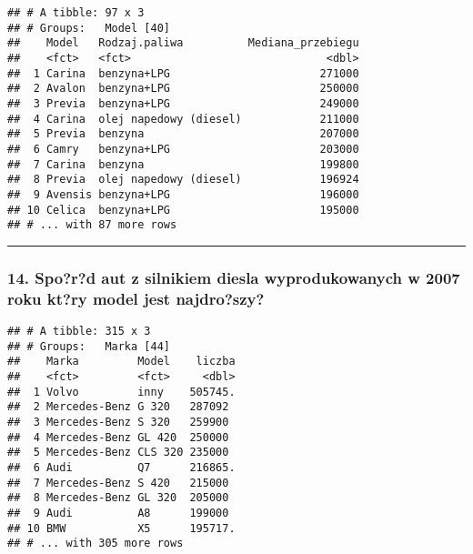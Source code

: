 \documentclass[]{article}
\newenvironment{Shaded}{\begin{snugshade}}{\end{snugshade}}
\newcommand{\KeywordTok}[1]{\textcolor[rgb]{0.13,0.29,0.53}{\textbf{#1}}}
\newcommand{\DataTypeTok}[1]{\textcolor[rgb]{0.13,0.29,0.53}{#1}}
\newcommand{\DecValTok}[1]{\textcolor[rgb]{0.00,0.00,0.81}{#1}}
\newcommand{\StringTok}[1]{\textcolor[rgb]{0.31,0.60,0.02}{#1}}
\newcommand{\OperatorTok}[1]{\textcolor[rgb]{0.81,0.36,0.00}{\textbf{#1}}}
\newcommand{\NormalTok}[1]{#1}
\begin{document}
\begin{verbatim}
## # A tibble: 97 x 3
## # Groups:   Model [40]
##    Model   Rodzaj.paliwa          Mediana_przebiegu
##    <fct>   <fct>                              <dbl>
##  1 Carina  benzyna+LPG                       271000
##  2 Avalon  benzyna+LPG                       250000
##  3 Previa  benzyna+LPG                       249000
##  4 Carina  olej napedowy (diesel)            211000
##  5 Previa  benzyna                           207000
##  6 Camry   benzyna+LPG                       203000
##  7 Carina  benzyna                           199800
##  8 Previa  olej napedowy (diesel)            196924
##  9 Avensis benzyna+LPG                       196000
## 10 Celica  benzyna+LPG                       195000
## # ... with 87 more rows
\end{verbatim}

\begin{center}\rule{0.5\linewidth}{\linethickness}\end{center}

\subsubsection{14. Spo?r?d aut z silnikiem diesla wyprodukowanych w 2007
roku kt?ry model jest
najdro?szy?}\label{spord-aut-z-silnikiem-diesla-wyprodukowanych-w-2007-roku-ktry-model-jest-najdroszy}

\begin{Shaded}
\end{Shaded}

\begin{verbatim}
## # A tibble: 315 x 3
## # Groups:   Marka [44]
##    Marka         Model    liczba
##    <fct>         <fct>     <dbl>
##  1 Volvo         inny    505745.
##  2 Mercedes-Benz G 320   287092 
##  3 Mercedes-Benz S 320   259900 
##  4 Mercedes-Benz GL 420  250000 
##  5 Mercedes-Benz CLS 320 235000 
##  6 Audi          Q7      216865.
##  7 Mercedes-Benz S 420   215000 
##  8 Mercedes-Benz GL 320  205000 
##  9 Audi          A8      199000 
## 10 BMW           X5      195717.
## # ... with 305 more rows
\end{verbatim}
\end{document}
